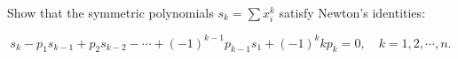 Show that the symmetric polynomials $s_k = \sum x_i^k$ satisfy Newton's identities:

$$s_k - p_1 s_{k-1} + p_2 s_{k-2} - \cdots + (-1)^{k-1} p_{k-1} s_1 + (-1)^k k p_k = 0, \quad k = 1, 2, \cdots, n.$$